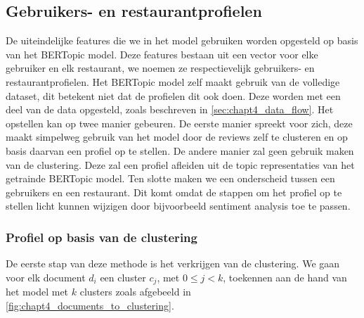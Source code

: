 \subsection{Gebruikers- en restaurantprofielen}
\label{sec:chapt4_nlp_profielen}
De uiteindelijke features die we in het model gebruiken worden opgesteld op basis van het BERTopic model. Deze features bestaan uit een vector voor elke gebruiker en elk restaurant, we noemen ze respectievelijk gebruikers- en restaurantprofielen. Het BERTopic model zelf maakt gebruik van de volledige dataset, dit betekent niet dat de profielen dit ook doen. Deze worden met een deel van de data opgesteld, zoals beschreven in \autoref{sec:chapt4_data_flow}. \newline
Het opstellen kan op twee manier gebeuren. De eerste manier spreekt voor zich, deze maakt simpelweg gebruik van het model door de reviews zelf te clusteren en op basis daarvan een profiel op te stellen. De andere manier zal geen gebruik maken van de clustering. Deze zal een profiel afleiden uit de topic representaties van het getrainde BERTopic model. Ten slotte maken we een onderscheid tussen een gebruikers en een restaurant. Dit komt omdat de stappen om het profiel op te stellen licht kunnen wijzigen door bijvoorbeeld sentiment analysis toe te passen.


\subsubsection{Profiel op basis van de clustering}
\label{sub:chapt4_profile_by_clustering}
De eerste stap van deze methode is het verkrijgen van de clustering. We gaan voor elk document $d_i$ een cluster $c_j$, met $0 \le j < k$, toekennen aan de hand van het model met $k$ clusters zoals afgebeeld in \autoref{fig:chapt4_documents_to_clustering}. 


